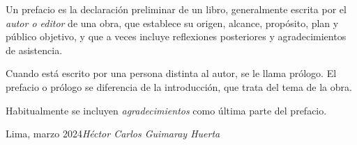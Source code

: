 %
%

\preface

Un prefacio es la declaración preliminar de un libro,
generalmente escrita por el \textit{autor o editor} de una obra, que
establece su origen, alcance, propósito, plan y público objetivo, y
que a veces incluye reflexiones posteriores y agradecimientos de
asistencia.

Cuando está escrito por una persona distinta al autor, se le llama
prólogo.
El prefacio o prólogo se diferencia de la introducción, que trata del
tema de la obra.

Habitualmente se incluyen \textit{agradecimientos} como última parte
del prefacio.

\vspace{\baselineskip}
\begin{flushright}\noindent
    Lima, marzo 2024\hfill {\it Héctor Carlos Guimaray Huerta}
\end{flushright}
